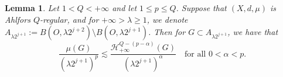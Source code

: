 \documentclass[10pt]{amsart}
\newtheorem{lemma}[theorem]{Lemma}
\numberwithin{equation}{section}
\newcommand{\Ha}{\mathcal{H}}
\begin{document}


  
  \begin{lemma}\label{lem:Measure-Content Bound}
  Let $1<Q<+\infty$ and let $1\le p\le Q$.  Suppose that $(X,d,\mu)$ is Ahlfors $Q$-regular, and for $+\infty>\lambda\ge 1$, we denote $A_{\lambda 2^{j+1}}:=B(O,\lambda 2^{j+2})\setminus B(O,\lambda 2^{j+1})$.  Then for $G\subset A_{\lambda 2^{j+1}}$, we have that 
  \[
  \frac{\mu(G)}{(\lambda 2^{j+1})^p}\lesssim\frac{\Ha^{Q-(p-\alpha)}_{+\infty}(G)}{(\lambda 2^{j+1})^\alpha}\quad\text{for all }0<\alpha<p.
  \]      
  \end{lemma}
\end{document}
